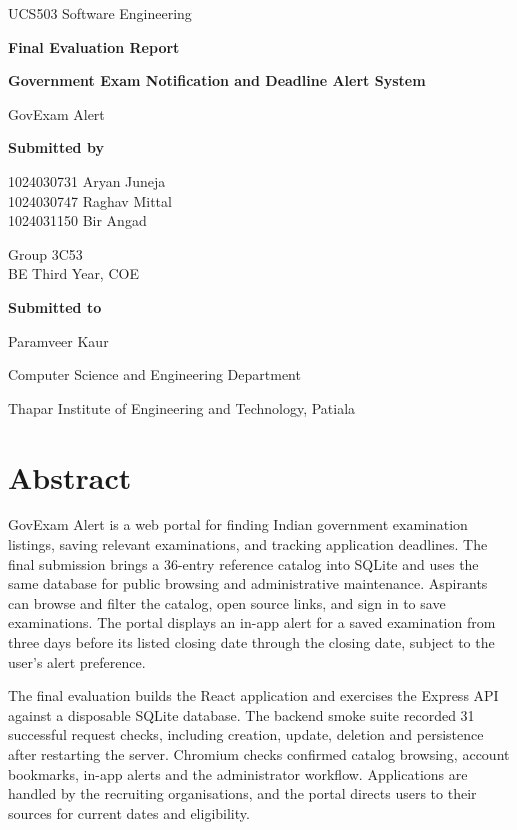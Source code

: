 \documentclass[12pt,a4paper]{report}
\begin{document}
\begin{titlepage}
\centering
{\Large UCS503 Software Engineering\par}
\vspace{0.5cm}
{\LARGE\bfseries Final Evaluation Report\par}
\vspace{1.6cm}
{\Huge\bfseries Government Exam Notification and Deadline Alert System\par}
\vspace{0.4cm}
{\Large GovExam Alert\par}
\vspace{1.3cm}
{\large\bfseries Submitted by\par}
\vspace{0.35cm}
1024030731 Aryan Juneja\\
1024030747 Raghav Mittal\\
1024031150 Bir Angad\par
\vspace{0.4cm}
Group 3C53\\
BE Third Year, COE\par
\vspace{1.3cm}
{\large\bfseries Submitted to\par}
\vspace{0.3cm}
Paramveer Kaur\par
\vfill
Computer Science and Engineering Department\par
Thapar Institute of Engineering and Technology, Patiala
\end{titlepage}
\chapter*{Abstract}

GovExam Alert is a web portal for finding Indian government examination listings, saving relevant examinations, and tracking application deadlines. The final submission brings a 36-entry reference catalog into SQLite and uses the same database for public browsing and administrative maintenance. Aspirants can browse and filter the catalog, open source links, and sign in to save examinations. The portal displays an in-app alert for a saved examination from three days before its listed closing date through the closing date, subject to the user's alert preference.


The final evaluation builds the React application and exercises the Express API against a disposable SQLite database. The backend smoke suite recorded 31 successful request checks, including creation, update, deletion and persistence after restarting the server. Chromium checks confirmed catalog browsing, account bookmarks, in-app alerts and the administrator workflow. Applications are handled by the recruiting organisations, and the portal directs users to their sources for current dates and eligibility.
\end{document}
